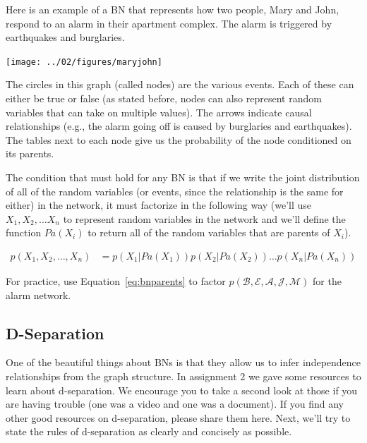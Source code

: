 \documentclass{tufte-handout}
\begin{document}
Here is an example of a BN that represents how two people, Mary and John, respond to an alarm in their apartment complex.  The alarm is triggered by earthquakes and burglaries.

\begin{center}
\texttt{[image: ../02/figures/maryjohn]}
\end{center}

The circles in this graph (called nodes) are the various events.  Each of these can either be true or false (as stated before, nodes can also represent random variables that can take on multiple values).  The arrows indicate causal relationships (e.g., the alarm going off is caused by burglaries and earthquakes).  The tables next to each node give us the probability of the node conditioned on its parents.

 The condition that must hold for any BN is that if we write the joint distribution of all of the random variables (or events, since the relationship is the same for either) in the network, it must factorize in the following way (we'll use $X_1, X_2, \ldots X_n$ to represent random variables in the network and we'll define the function $Pa(X_i)$ to return all of the random variables that are parents of $X_i$).

\begin{align}
p(X_1, X_2, \ldots, X_n) &= p(X_1 | Pa(X_1)) p(X_2 | Pa(X_2)) \ldots p(X_n | Pa(X_n)) \label{eq:bnparents}
\end{align}

\begin{exercise}
For practice, use Equation~\ref{eq:bnparents} to factor $p(\mathcal{B}, \mathcal{E}, \mathcal{A}, \mathcal{J}, \mathcal{M})$ for the alarm network.
\end{exercise}



\subsection{D-Separation}
One of the beautiful things about BNs is that they allow us to infer independence relationships from the graph structure.  In assignment 2 we gave some resources to learn about d-separation.  We encourage you to take a second look at those if you are having trouble (one was a video and one was a document).  If you find any other good resources on d-separation, please share them here.  Next, we'll try to state the rules of d-separation as clearly and concisely as possible.
\end{document}
